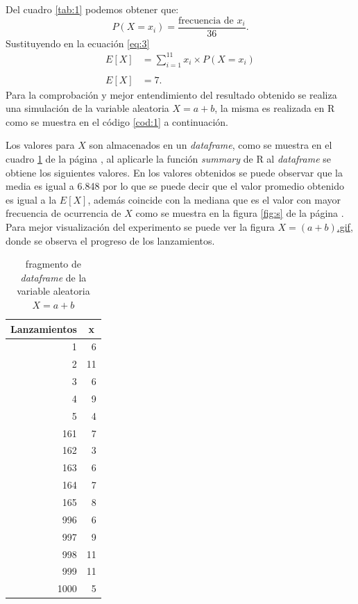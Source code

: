 \documentclass{article}
\begin{document}
Del cuadro \ref{tab:1} podemos obtener que:
\begin{equation}
 P(X = x_{i}) = \frac{\text{frecuencia de $x_{i}$} }{36}.   
\end{equation}
Sustituyendo en la ecuación \ref{eq:3}
\begin{equation}
\begin{array}{ll}
   E[X] &= \sum_{i=1}^{11} x_{i}  \times P(X=x_{i})\\
   &\\
   E[X] & = 7.
  \end{array}
\end{equation}
Para la comprobación y mejor entendimiento del resultado obtenido se realiza una simulación de la variable aleatoria $X = a + b$, la misma es realizada en R \cite{R} como se muestra en el código \ref{cod:1} a continuación.
\begin{center}

\label{cod:1}
\end{center}
Los valores para $X$ son almacenados en un \textit{dataframe}, como se muestra en el cuadro \ref{tab:s} de la página \pageref{tab:s}, al aplicarle la función \textit{summary} de R al \textit{dataframe} se obtiene los siguientes valores.  
En los valores obtenidos se puede observar que la media es igual a 6.848 por lo que se puede decir que el valor promedio obtenido es igual a la $E[X]$, además coincide con la mediana que es el valor con mayor frecuencia de ocurrencia de $X$ como se muestra en la figura \ref{fig:s} de la página \pageref{fig:s}. Para mejor visualización del experimento se puede ver la figura  \href{https://github.com/Albertomnoa/Tareas_MPA/blob/master/Tarea10/gif/suma.gif}{$X = (a+b)$.gif}, donde se observa el progreso de los lanzamientos.

\begin{table}[H]
  \centering
  \caption{fragmento de \textit{dataframe} de la variable aleatoria $X = a + b$}
    \begin{tabular}{rr}
    \toprule
    \multicolumn{1}{c}{Lanzamientos} & \multicolumn{1}{c}{x} \\
    \midrule
    1     & 6 \\
    2     & 11 \\
    3     & 6 \\
    4     & 9 \\
    5     & 4 \\
    161   & 7 \\
    162   & 3 \\
    163   & 6 \\
    164   & 7 \\
    165   & 8 \\
    996   & 6 \\
    997   & 9 \\
    998   & 11 \\
    999   & 11 \\
    1000  & 5 \\
    \bottomrule
    \end{tabular}%
  \label{tab:s}%
\end{table}%
\end{document}

